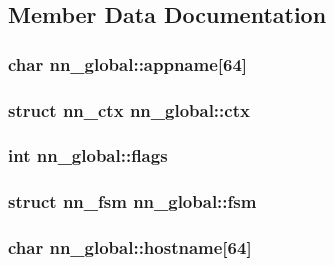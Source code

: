 \subsection{Member Data Documentation}
\subsubsection[{appname}]{\setlength{\rightskip}{0pt plus 5cm}char nn\+\_\+global\+::appname\mbox{[}64\mbox{]}}\hypertarget{structnn__global_a6c0970e479ba853119a5ecf5e858a29e}{}\label{structnn__global_a6c0970e479ba853119a5ecf5e858a29e}
\subsubsection[{ctx}]{\setlength{\rightskip}{0pt plus 5cm}struct {\bf nn\+\_\+ctx} nn\+\_\+global\+::ctx}\hypertarget{structnn__global_a785576884be1ca2618171882c8fb797e}{}\label{structnn__global_a785576884be1ca2618171882c8fb797e}
\subsubsection[{flags}]{\setlength{\rightskip}{0pt plus 5cm}int nn\+\_\+global\+::flags}\hypertarget{structnn__global_a14a59ff08fbab1ca0a02b1de0c1aa3d4}{}\label{structnn__global_a14a59ff08fbab1ca0a02b1de0c1aa3d4}
\subsubsection[{fsm}]{\setlength{\rightskip}{0pt plus 5cm}struct {\bf nn\+\_\+fsm} nn\+\_\+global\+::fsm}\hypertarget{structnn__global_a4a70871e752cab1ff856b584d64ec63b}{}\label{structnn__global_a4a70871e752cab1ff856b584d64ec63b}
\subsubsection[{hostname}]{\setlength{\rightskip}{0pt plus 5cm}char nn\+\_\+global\+::hostname\mbox{[}64\mbox{]}}\hypertarget{structnn__global_a5c5b258b0ace109bb10a1e007429725e}{}\label{structnn__global_a5c5b258b0ace109bb10a1e007429725e}
